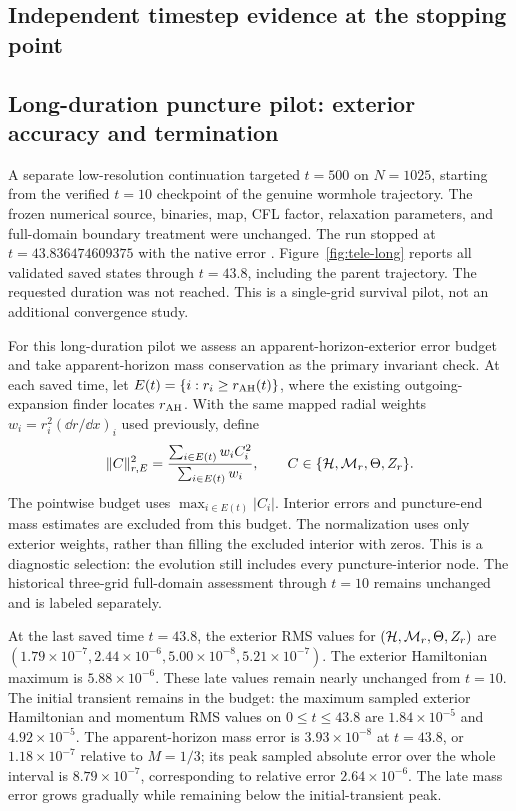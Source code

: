 \subsection{Independent timestep evidence at the stopping point}



\subsection{Long-duration puncture pilot: exterior accuracy and termination}
\label{sec:tele-long}
A separate low-resolution continuation targeted $t=500$ on $N=1025$, starting from the verified $t=10$ checkpoint of the genuine wormhole trajectory. The frozen numerical source, binaries, map, CFL factor, relaxation parameters, and full-domain boundary treatment were unchanged. The run stopped at $t=43.836474609375$ with the native error . Figure~\ref{fig:tele-long} reports all validated saved states through $t=43.8$, including the parent trajectory. The requested duration was not reached. This is a single-grid survival pilot, not an additional convergence study.

For this long-duration pilot we assess an apparent-horizon-exterior error budget and take apparent-horizon mass conservation as the primary invariant check. At each saved time, let $E(t)=\{i:r_i\geq r_{\rm AH}(t)\}$, where the existing outgoing-expansion finder locates $r_{\rm AH}$. With the same mapped radial weights $w_i=r_i^2(\dd r/\dd x)_i$ used previously, define
\begin{equation}
 \|C\|_{r,E}^2=\frac{\sum_{i\in E(t)}w_i C_i^2}{\sum_{i\in E(t)}w_i},
 \qquad C\in\{\mathcal H,\mathcal M_r,\Theta,Z_r\}.
 \label{eq:exterior-norm}
\end{equation}
The pointwise budget uses $\max_{i\in E(t)}|C_i|$. Interior errors and puncture-end mass estimates are excluded from this budget. The normalization uses only exterior weights, rather than filling the excluded interior with zeros. This is a diagnostic selection: the evolution still includes every puncture-interior node. The historical three-grid full-domain assessment through $t=10$ remains unchanged and is labeled separately.

At the last saved time $t=43.8$, the exterior RMS values for $(\mathcal H,\mathcal M_r,\Theta,Z_r)$ are $(1.79\times10^{-7},2.44\times10^{-6},5.00\times10^{-8},5.21\times10^{-7})$. The exterior Hamiltonian maximum is $5.88\times10^{-6}$. These late values remain nearly unchanged from $t=10$. The initial transient remains in the budget: the maximum sampled exterior Hamiltonian and momentum RMS values on $0\leq t\leq43.8$ are $1.84\times10^{-5}$ and $4.92\times10^{-5}$. The apparent-horizon mass error is $3.93\times10^{-8}$ at $t=43.8$, or $1.18\times10^{-7}$ relative to $M=1/3$; its peak sampled absolute error over the whole interval is $8.79\times10^{-7}$, corresponding to relative error $2.64\times10^{-6}$. The late mass error grows gradually while remaining below the initial-transient peak.

